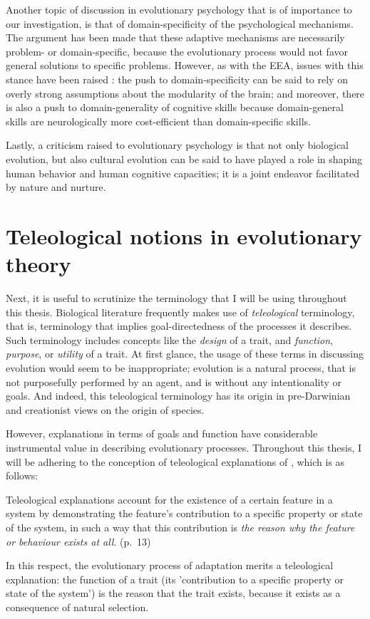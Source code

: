 Another topic of discussion in evolutionary psychology that is of importance to our investigation, is that of domain-specificity of the psychological mechanisms. The argument has been made \citep[p.~50]{Buss15} that these adaptive mechanisms are necessarily problem- or domain-specific, because the evolutionary process would not favor general solutions to specific problems.
However, as with the EEA, issues with this stance have been raised \citep{LB02}: the push to domain-specificity can be said to rely on overly strong assumptions about the modularity of the brain; and moreover, there is also a push to domain-generality of cognitive skills because domain-general skills are neurologically more cost-efficient than domain-specific skills.

Lastly, a criticism raised to evolutionary psychology is that not only biological evolution, but also cultural evolution can be said to have played a role in shaping human behavior and human cognitive capacities; it is a joint endeavor facilitated by nature and nurture.

\section{Teleological notions in evolutionary theory}
\label{sec:teleology}

Next, it is useful to scrutinize the terminology that I will be using throughout this thesis.
Biological literature frequently makes use of \emph{teleological} terminology, that is, terminology that implies goal-directedness of the processes it describes. Such terminology includes concepts like the \emph{design} of a trait, and \emph{function}, \emph{purpose}, or \emph{utility} of a trait.
At first glance, the usage of these terms in discussing evolution would seem to be inappropriate; evolution is a natural process, that is not purposefully performed by an agent, and is without any intentionality or goals. And indeed, this teleological terminology has its origin in pre-Darwinian and creationist views on the origin of species.

However, explanations in terms of goals and function have considerable instrumental value in describing evolutionary processes. Throughout this thesis, I will be adhering to the conception of teleological explanations of \citet{Ayala99}, which is as follows:
\begin{quoting}
    Teleological explanations account for the existence of a certain feature in a system by demonstrating the feature’s contribution to a specific property or state of the system, in such a way that this contribution is \emph{the reason why the feature or behaviour exists at all}.
    \hfill (p.~13)
\end{quoting}
In this respect, the evolutionary process of adaptation merits a teleological explanation: the function of a trait (its 'contribution to a specific property or state of the system') is the reason that the trait exists, because it exists as a consequence of natural selection.

